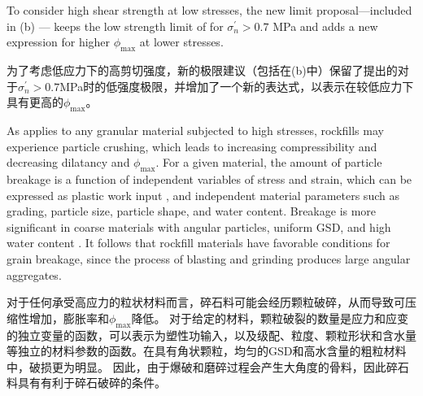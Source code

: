 \begin{ParaColumn}

    \switchcolumn*

    To consider high shear strength at low stresses, the new limit proposal—included in (b) — keeps the low strength limit of \citet{Indraratna1994539} for $\sigma_n^\prime>0.7$ MPa and adds a new expression for higher $\phi_{\max}$ at lower stresses.

    \switchcolumn

    为了考虑低应力下的高剪切强度，新的极限建议（包括在(b)中）保留了\citet{Indraratna1994539}提出的对于$\sigma_n^\prime>0.7$MPa时的低强度极限，并增加了一个新的表达式，以表示在较低应力下具有更高的$\phi_{\max}$。


    As applies to any granular material subjected to high stresses, rockfills may experience particle crushing, which leads to increasing compressibility and decreasing dilatancy and $\phi_{\max}$\citep{Vesic1968661,Biarez19941,Lade1996309,Biarez1997607,Ovalle2015587,Dano201895}. For a given material, the amount of particle breakage is a function of independent variables of stress and strain, which can be expressed as plastic work input \citep{Daouadji2001113,Yin2017,Ovalle2020487}, and independent material parameters such as grading, particle size, particle shape, and water content. Breakage is more significant in coarse materials with angular particles, uniform GSD, and high water content \citep{Hardin19851177,Ovalle2013123,Ovalle2018161}. It follows that rockfill materials have favorable conditions for grain breakage, since the process of blasting and grinding produces large angular aggregates.

    \switchcolumn

    对于任何承受高应力的粒状材料而言，碎石料可能会经历颗粒破碎，从而导致可压缩性增加，膨胀率和$\phi_{\max}$降低\citep{Vesic1968661,Biarez19941,Lade1996309,Biarez1997607,Ovalle2015587,Dano201895}。 对于给定的材料，颗粒破裂的数量是应力和应变的独立变量的函数，可以表示为塑性功输入\citep{Daouadji2001113,Yin2017,Ovalle2020487}，以及级配、粒度、颗粒形状和含水量等独立的材料参数的函数。在具有角状颗粒，均匀的GSD和高水含量的粗粒材料中，破损更为明显\citep{Hardin19851177,Ovalle2013123,Ovalle2018161}。 因此，由于爆破和磨碎过程会产生大角度的骨料，因此碎石料具有有利于碎石破碎的条件。
    

\end{ParaColumn}
